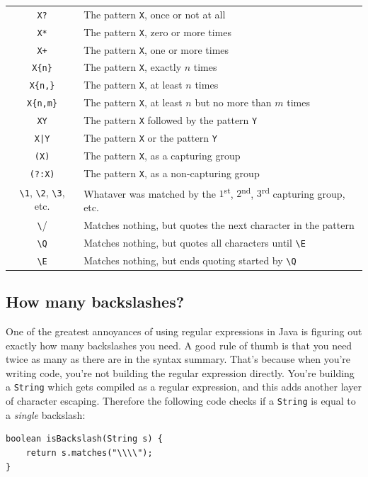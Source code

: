 \documentclass[a4paper,12pt]{article}
\begin{document}
\begin{tabular*}{\textwidth}{|c|l|}
\verb/X?/ & The pattern \verb/X/, once or not at all \\
\verb/X*/ & The pattern \verb/X/, zero or more times \\
\verb/X+/ & The pattern \verb/X/, one or more times \\
\verb/X{n}/ & The pattern \verb/X/, exactly $n$ times \\
\verb/X{n,}/ & The pattern \verb/X/, at least $n$ times \\
\verb/X{n,m}/ & The pattern \verb/X/, at least $n$ but no more than $m$ times \\
\verb/XY/ & The pattern \verb/X/ followed by the pattern \verb/Y/ \\
\verb/X|Y/ & The pattern \verb/X/ or the pattern \verb/Y/ \\
\verb/(X)/ & The pattern \verb/X/, as a capturing group \\
\verb/(?:X)/ & The pattern \verb/X/, as a non-capturing group \\
\verb/\1/, \verb/\2/, \verb/\3/, etc. & Whataver was matched by the $1$\textsuperscript{st}, $2$\textsuperscript{nd}, $3$\textsuperscript{rd} capturing group, etc. \\
\verb/\/ & Matches nothing, but quotes the next character in the pattern \\
\verb/\Q/ & Matches nothing, but quotes all characters until \verb/\E/ \\
\verb/\E/ & Matches nothing, but ends quoting started by \verb/\Q/ \\
\hline
\end{tabular*}
\pagebreak

\subsection{How many backslashes?}

One of the greatest annoyances of using regular expressions in Java is figuring out exactly how many backslashes you need. A good rule of thumb is that you need twice as many as there are in the syntax summary. That's because when you're writing code, you're not building the regular expression directly. You're building a \verb/String/ which gets compiled as a regular expression, and this adds another layer of character escaping. Therefore the following code checks if a \verb/String/ is equal to a {\em single} backslash:

\begin{lstlisting}
boolean isBackslash(String s) {
	return s.matches("\\\\");
}
\end{lstlisting}
\end{document}
